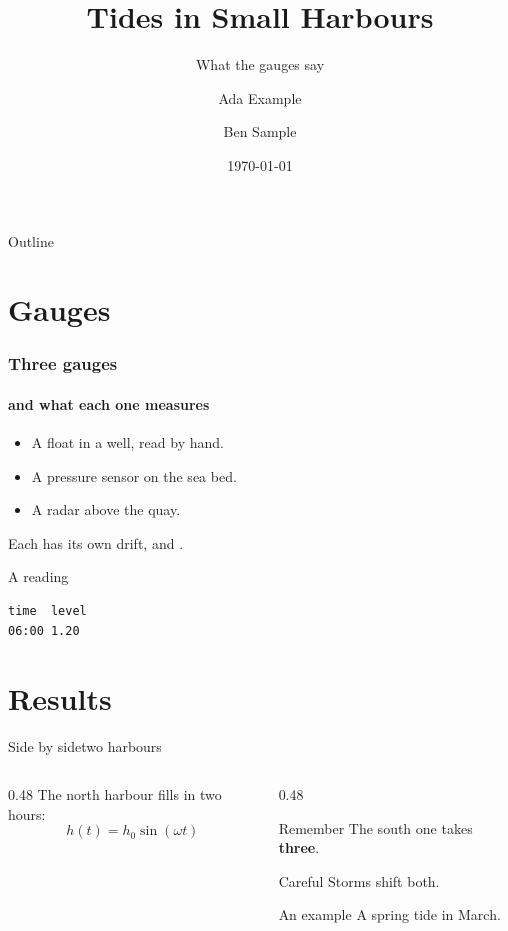 \documentclass{beamer}
\title{Tides in Small Harbours}
\subtitle{What the gauges say}
\author{Ada Example \and Ben Sample}
\institute{Institute of Invented Places}
\date{\today}
\newcommand{\term}[1]{\alert{#1}}
\begin{document}
\begin{frame}
  \titlepage
\end{frame}

\begin{frame}{Outline}
  \tableofcontents[hideallsubsections]
\end{frame}

\section{Gauges}
\begin{frame}
  \frametitle{Three gauges}
  \framesubtitle{and what each one measures}
  \begin{itemize}
    \item<1-> A float in a well, read by hand.
    \item<2-> A pressure sensor on the sea bed.
    \item<3-| alert@3> A radar above the quay.
  \end{itemize}
  \pause
  Each has its own \term{drift}, and .
\end{frame}

\begin{frame}[fragile]{A reading}
  \begin{verbatim}
time  level
06:00 1.20
\end{verbatim}
\end{frame}

\section{Results}
\begin{frame}{Side by side}{two harbours}
  \begin{columns}[T]
    \begin{column}{0.48\textwidth}
      The north harbour fills in two hours:
      \[ h(t) = h_0 \sin(\omega t) \]
    \end{column}
    \begin{column}{0.48\textwidth}
      \begin{block}{Remember}
        The south one takes \textbf{three}.
      \end{block}
      \begin{alertblock}{Careful}
        Storms shift both.
      \end{alertblock}
      \begin{exampleblock}{An example}
        A spring tide in March.
      \end{exampleblock}
    \end{column}
  \end{columns}
\end{frame}
\end{document}
